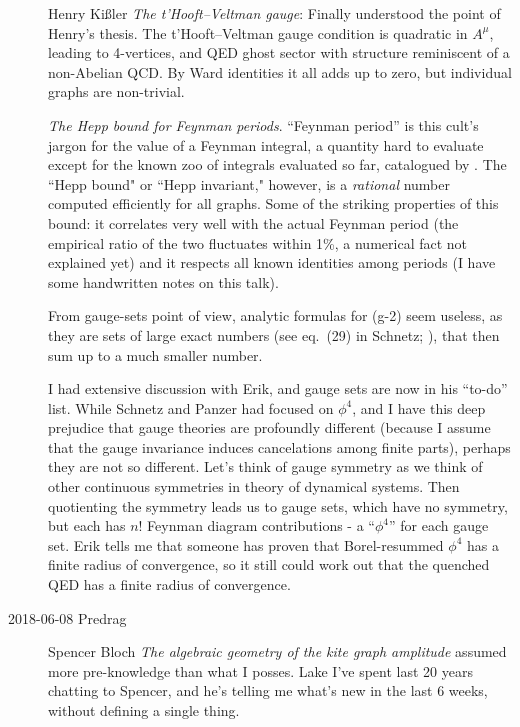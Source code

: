 \begin{description}
{Henry Ki{\ss}ler} {\em The t'Hooft–Veltman gauge}:
Finally understood the point of Henry's thesis. The t'Hooft–Veltman gauge
condition is quadratic in $A^\mu$, leading to 4-vertices, and QED ghost
sector with structure reminiscent of a non-Abelian QCD.  By Ward
identities it all adds up to zero, but individual graphs are non-trivial.

 {\em The Hepp
bound for Feynman periods}. ``Feynman period'' is this cult's jargon for
the value of a Feynman integral, a quantity hard to evaluate except for
the known zoo of integrals evaluated so far, catalogued by
. The ``Hepp bound" or ``Hepp invariant," however,
is a \emph{rational} number computed efficiently for all graphs. Some of
the striking properties of this bound: it correlates very well with the
actual Feynman period (the empirical ratio of the two fluctuates within
1\%, a numerical fact not explained yet) and it respects all known
identities among periods  (I have some handwritten notes on this talk).

From gauge-sets point of view, analytic formulas for (g-2) seem useless,
as they are sets of large exact numbers (see eq.~(29) in
Schnetz; ), that then sum up to a
much smaller number.

I had extensive discussion with Erik, and gauge sets are now in his
``to-do'' list. While Schnetz and Panzer had focused on $\phi^4$, and I
have this deep prejudice that gauge theories are profoundly different
(because I assume that the gauge invariance induces cancelations among
finite parts), perhaps they are not so different. Let's think of gauge
symmetry as we think of other continuous symmetries in theory of
dynamical systems. Then quotienting the symmetry leads us to gauge sets,
which have no symmetry, but each has $n!$ Feynman diagram contributions -
a ``$\phi^4$'' for each gauge set. Erik tells me that someone has proven
that Borel-resummed $\phi^4$ has a finite radius of convergence, so it
still could work out that the quenched QED has a finite radius of
convergence.


\item[2018-06-08 Predrag]

Spencer Bloch {\em The algebraic geometry of the kite graph amplitude}
assumed more pre-knowledge than what I posses. Lake I've spent last 20
years chatting to Spencer, and he's telling me what's new in the last 6
weeks, without defining a single thing.


\end{description}
